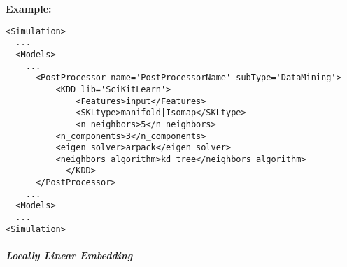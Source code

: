 \textbf{Example:}
\begin{lstlisting}[style=XML,morekeywords={subType}]
<Simulation>
  ...
  <Models>
    ...
      <PostProcessor name='PostProcessorName' subType='DataMining'>
          <KDD lib='SciKitLearn'>
              <Features>input</Features>
              <SKLtype>manifold|Isomap</SKLtype>
              <n_neighbors>5</n_neighbors>
	      <n_components>3</n_components>
	      <eigen_solver>arpack</eigen_solver>
	      <neighbors_algorithm>kd_tree</neighbors_algorithm>
            </KDD>
      </PostProcessor>
    ...
  <Models>
  ...
<Simulation>
\end{lstlisting}


\subparagraph{Locally Linear Embedding} \hfil \\
\label{subparagraph:LLE}
